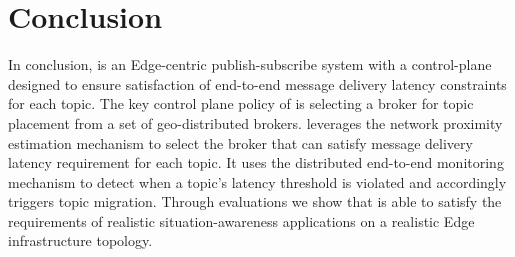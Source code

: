\section{Conclusion}
\label{sec:epulsar_conclusion}
In conclusion, \epulsar{} is an Edge-centric publish-subscribe system with a control-plane designed to ensure satisfaction of end-to-end message delivery latency constraints for each topic. The key control plane policy of \epulsar{} is selecting a broker for topic placement from a set of geo-distributed brokers. \epulsar{} leverages the network proximity estimation mechanism to select the broker that can satisfy message delivery latency requirement for each topic. It uses the distributed end-to-end monitoring mechanism to detect when a topic's latency threshold is violated and accordingly triggers topic migration. Through evaluations we show that \epulsar{} is able to satisfy the requirements of realistic situation-awareness applications on a realistic Edge infrastructure topology.